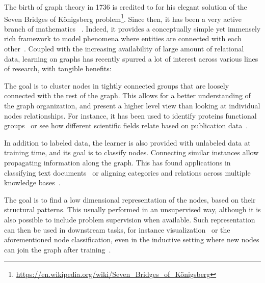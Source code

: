 The birth of graph theory in 1736 is credited to \textcite{euler1741} for his elegant solution of
the Seven Bridges of Königsberg
problem\footnote{\url{https://en.wikipedia.org/wiki/Seven_Bridges_of_Königsberg}}. Since then,
it has been a very active branch of mathematics ~\autocite{biggs1976graph}. Indeed, it provides a
conceptually simple yet immensely rich framework to model phenomena where entities are connected
with each other~\autocite{ComplexNetworksApp11}. Coupled with the increasing availability of large
amount of relational data, learning on graphs has recently spurred a lot of interest across various
lines of research, with tangible benefits: 

\begin{description}[leftmargin=*]

  \item[community detection~\autocite{FortunatoSurvey10}] The goal is to cluster nodes in tightly
    connected groups that are loosely connected with the rest of the graph. This allows for a better
    understanding of the graph organization, and present a higher level view than looking at
    individual nodes relationships. For instance, it has been used to identify proteins functional
    groups~\autocite{clusterBio03} or see how different scientific fields relate based on
    publication data~\autocite{clusterScience08}.

  \item[semi-supervised learning~\autocites{SSL06}{graphSSL14}] In addition to labeled data,
    the learner is also provided with unlabeled data at training time, and its goal is to classify
    nodes. Connecting similar instances allow propagating information along the graph. This has
    found applications in classifying text documents~\autocite{sslText09} or aligning categories and
    relations across multiple knowledge bases~\autocite{sslKB13}.


  \item[node embedding~\autocite{representationLearning17}] The goal is to find a low dimensional
    representation of the nodes, based on their structural patterns. This usually performed in an
    unsupervised way, although it is also possible to include problem supervision when available.
    Such representation can then be used in downstream tasks, for instance
    visualization~\autocite{LINE15} or the aforementioned node classification, even in the inductive
    setting where new nodes can join the graph after training~\autocite{inductiveRepresentation17}.


\end{description}

